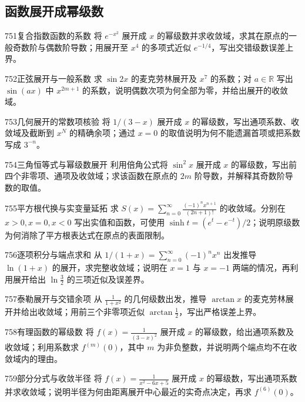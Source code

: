 \subsection{函数展开成幂级数}
\begin{exercise}{751}{复合指数函数的系数}
将 $e^{-x^2}$ 展开成 $x$ 的幂级数并求收敛域，求其在原点的一般奇数阶与偶数阶导数；用展开至 $x^4$ 的多项式近似 $e^{-1/4}$，写出交错级数误差上界。
\end{exercise}
\begin{exercise}{752}{正弦展开与一般系数}
求 $\sin2x$ 的麦克劳林展开及 $x^7$ 的系数；对 $a\in\mathbb R$ 写出 $\sin(ax)$ 中 $x^{2m+1}$ 的系数，说明偶数次项为何全部为零，并给出展开的收敛域。
\end{exercise}
\begin{exercise}{753}{几何展开的常数项核验}
将 $1/(3-x)$ 展开成 $x$ 的幂级数，写出通项系数、收敛域及截断到 $x^N$ 的精确余项；通过 $x=0$ 的取值说明为何不能遗漏首项或把系数写成 $3^{-n}$。
\end{exercise}
\begin{exercise}{754}{三角恒等式与幂级数展开}
利用倍角公式将 $\sin^2x$ 展开成 $x$ 的幂级数，写出前四个非零项、通项及收敛域；求该函数在原点的 $2m$ 阶导数，并解释其奇数阶导数的取值。
\end{exercise}
\begin{exercise}{755}{平方根代换与实变量延拓}
求 $S(x)=\sum_{n=0}^{\infty}\frac{(-1)^nx^{n+1}}{(2n+1)!}$ 的收敛域。分别在 $x>0,x=0,x<0$ 写出实值和函数，可使用 $\sinh t=(e^t-e^{-t})/2$；说明原级数为何消除了平方根表达式在原点的表面限制。
\end{exercise}
\begin{exercise}{756}{逐项积分与端点求和}
从 $1/(1+x)=\sum_{n=0}^{\infty}(-1)^nx^n$ 出发推导 $\ln(1+x)$ 的展开，求完整收敛域；说明在 $x=1$ 与 $x=-1$ 两端的情况，再利用展开给出 $\ln\frac32$ 的三项近似及误差界。
\end{exercise}
\begin{exercise}{757}{泰勒展开与交错余项}
从 $\frac1{1+x^2}$ 的几何级数出发，推导 $\arctan x$ 的麦克劳林展开并给出收敛域；用前三个非零项近似 $\arctan\frac12$，写出严格误差上界。
\end{exercise}
\begin{exercise}{758}{有理函数的幂级数}
将 $f(x)=\frac1{(3-x)^2}$ 展开成 $x$ 的幂级数，给出通项系数及收敛域；利用系数求 $f^{(m)}(0)$，其中 $m$ 为非负整数，并说明两个端点均不在收敛域内的理由。
\end{exercise}
\begin{exercise}{759}{部分分式与收敛半径}
将 $f(x)=\frac1{x^2-6x+5}$ 展开成 $x$ 的幂级数，写出通项系数并求收敛域；说明半径为何由距离展开中心最近的实奇点决定，再求 $f^{(6)}(0)$。
\end{exercise}
